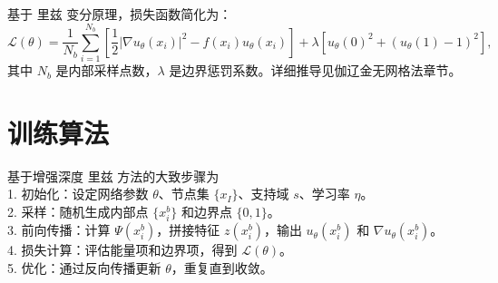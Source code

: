 \documentclass[engineeringmaster]{hquThesis}
\begin{document}
基于 里兹 变分原理，损失函数简化为：
\begin{equation}
\mathcal{L}(\theta) = \frac{1}{N_b} \sum_{i=1}^{N_b} \left[ \frac{1}{2} |\nabla u_\theta(x_i)|^2 - f(x_i) u_\theta(x_i) \right] + \lambda \left[ u_\theta(0)^2 + (u_\theta(1) - 1)^2 \right],
\end{equation}
其中 \(N_b\) 是内部采样点数，\(\lambda\) 是边界惩罚系数。详细推导见伽辽金无网格法章节。

\section{训练算法}
基于增强深度 里兹 方法的大致步骤为\\
1. 初始化：设定网络参数 \(\theta\)、节点集 \(\{x_I\}\)、支持域 \(s\)、学习率 \(\eta\)。\\
2. 采样：随机生成内部点 \(\{x_i^b\}\) 和边界点 \(\{0, 1\}\)。\\
3. 前向传播：计算 \(\Psi(x_i^b)\)，拼接特征 \(z(x_i^b)\)，输出 \(u_\theta(x_i^b)\) 和 \(\nabla u_\theta(x_i^b)\)。\\
4. 损失计算：评估能量项和边界项，得到 \(\mathcal{L}(\theta)\)。\\
5. 优化：通过反向传播更新 \(\theta\)，重复直到收敛。
\end{document}
